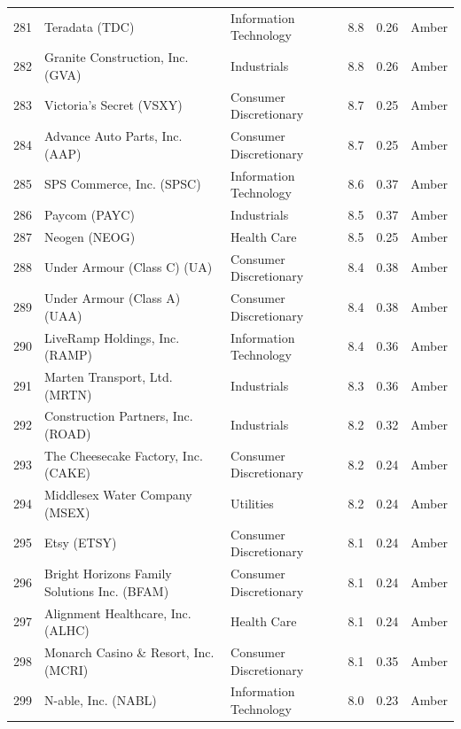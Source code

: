\documentclass[11pt,a4paper]{article}
\begin{document}
{\begin{longtable}{r p{4.6cm} p{3cm} r r l}
281 & Teradata (TDC) & Information Technology & 8.8 & 0.26 & \cellcolor[HTML]{FFEB9C}Amber \\
282 & Granite Construction, Inc. (GVA) & Industrials & 8.8 & 0.26 & \cellcolor[HTML]{FFEB9C}Amber \\
283 & Victoria's Secret (VSXY) & Consumer Discretionary & 8.7 & 0.25 & \cellcolor[HTML]{FFEB9C}Amber \\
284 & Advance Auto Parts, Inc. (AAP) & Consumer Discretionary & 8.7 & 0.25 & \cellcolor[HTML]{FFEB9C}Amber \\
285 & SPS Commerce, Inc. (SPSC) & Information Technology & 8.6 & 0.37 & \cellcolor[HTML]{FFEB9C}Amber \\
286 & Paycom (PAYC) & Industrials & 8.5 & 0.37 & \cellcolor[HTML]{FFEB9C}Amber \\
287 & Neogen (NEOG) & Health Care & 8.5 & 0.25 & \cellcolor[HTML]{FFEB9C}Amber \\
288 & Under Armour (Class C) (UA) & Consumer Discretionary & 8.4 & 0.38 & \cellcolor[HTML]{FFEB9C}Amber \\
289 & Under Armour (Class A) (UAA) & Consumer Discretionary & 8.4 & 0.38 & \cellcolor[HTML]{FFEB9C}Amber \\
290 & LiveRamp Holdings, Inc. (RAMP) & Information Technology & 8.4 & 0.36 & \cellcolor[HTML]{FFEB9C}Amber \\
291 & Marten Transport, Ltd. (MRTN) & Industrials & 8.3 & 0.36 & \cellcolor[HTML]{FFEB9C}Amber \\
292 & Construction Partners, Inc. (ROAD) & Industrials & 8.2 & 0.32 & \cellcolor[HTML]{FFEB9C}Amber \\
293 & The Cheesecake Factory, Inc. (CAKE) & Consumer Discretionary & 8.2 & 0.24 & \cellcolor[HTML]{FFEB9C}Amber \\
294 & Middlesex Water Company (MSEX) & Utilities & 8.2 & 0.24 & \cellcolor[HTML]{FFEB9C}Amber \\
295 & Etsy (ETSY) & Consumer Discretionary & 8.1 & 0.24 & \cellcolor[HTML]{FFEB9C}Amber \\
296 & Bright Horizons Family Solutions Inc. (BFAM) & Consumer Discretionary & 8.1 & 0.24 & \cellcolor[HTML]{FFEB9C}Amber \\
297 & Alignment Healthcare, Inc. (ALHC) & Health Care & 8.1 & 0.24 & \cellcolor[HTML]{FFEB9C}Amber \\
298 & Monarch Casino \& Resort, Inc. (MCRI) & Consumer Discretionary & 8.1 & 0.35 & \cellcolor[HTML]{FFEB9C}Amber \\
299 & N-able, Inc. (NABL) & Information Technology & 8.0 & 0.23 & \cellcolor[HTML]{FFEB9C}Amber \\

\end{longtable}}
\end{document}
